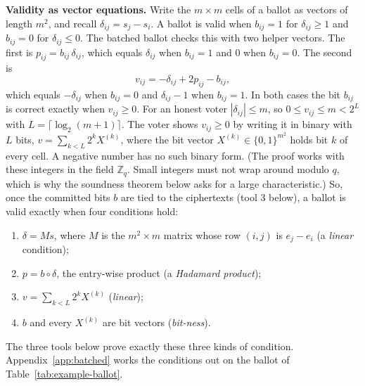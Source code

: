 \textbf{Validity as vector equations.} Write the $m \times m$ cells of a
ballot as vectors of length $m^2$, and recall $\delta_{ij} = s_j - s_i$.
A ballot is valid when $b_{ij} = 1$ for $\delta_{ij} \ge 1$ and $b_{ij} =
0$ for $\delta_{ij} \le 0$. The batched ballot checks this with two
helper vectors. The first is $p_{ij} = b_{ij}\,\delta_{ij}$, which equals
$\delta_{ij}$ when $b_{ij} = 1$ and $0$ when $b_{ij} = 0$. The second is
\[
  v_{ij} = -\delta_{ij} + 2p_{ij} - b_{ij},
\]
which equals $-\delta_{ij}$ when $b_{ij} = 0$ and $\delta_{ij} - 1$ when
$b_{ij} = 1$. In both cases the bit $b_{ij}$ is correct exactly when
$v_{ij} \ge 0$. For an honest voter $|\delta_{ij}| \le m$, so $0 \le
v_{ij} \le m < 2^L$ with $L = \lceil \log_2(m+1) \rceil$. The voter shows
$v_{ij} \ge 0$ by writing it in binary with $L$ bits, $v = \sum_{k<L} 2^k
X^{(k)}$, where the bit vector $X^{(k)} \in \{0,1\}^{m^2}$ holds bit $k$
of every cell. A negative number has no such binary form. (The proof
works with these integers in the field $\mathbb{Z}_q$. Small integers
must not wrap around modulo $q$, which is why the soundness theorem
below asks for a large characteristic.) So, once the committed bits $b$ are
tied to the ciphertexts (tool 3 below), a ballot is valid exactly when
four conditions hold:
\begin{enumerate}
  \item[(V1)] $\delta = Ms$, where $M$ is the $m^2 \times m$ matrix whose
  row $(i, j)$ is $e_j - e_i$ (a \emph{linear} condition);
  \item[(V2)] $p = b \circ \delta$, the entry-wise product (a
  \emph{Hadamard product});
  \item[(V3)] $v = \sum_{k<L} 2^k X^{(k)}$ (\emph{linear});
  \item[(V4)] $b$ and every $X^{(k)}$ are bit vectors (\emph{bit-ness}).
\end{enumerate}
The three tools below prove exactly these three kinds of condition.
Appendix~\ref{app:batched} works the conditions out on the ballot of
Table~\ref{tab:example-ballot}.

